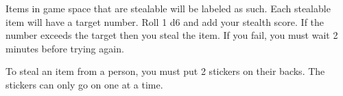 \documentclass[green]{LRSguildcamp1}
\begin{document}
\name{\gStealing{}}

Items in game space that are stealable will be labeled as such. Each stealable item will have a target number. Roll 1 d6 and add your stealth score.  If the number exceeds the target then you steal the item. If you fail, you must wait 2 minutes before trying again.

To steal an item from a person, you must put 2 stickers on their backs. The stickers can only go on one at a time. 
\end{document}

